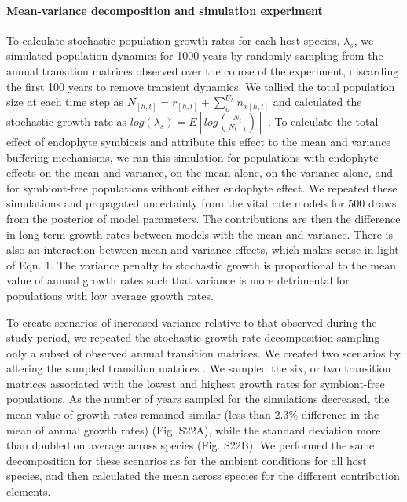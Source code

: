\documentclass[12pt]{article}
\begin{document}
\paragraph*{Mean-variance decomposition and simulation experiment}
To calculate stochastic population growth rates for each host species, $\lambda_s$, we simulated population dynamics for 1000 years by randomly sampling from the annual transition matrices observed over the course of the experiment, discarding the first 100 years to remove transient dynamics. 
We tallied the total population size at each time step as  $N_{[h,t]} = r_{[h,t]} + \sum_{o}^{U_h}n_{x[h,t]}$ and calculated the stochastic growth rate as $log(\lambda_s) = E[log(\frac{N_{t}}{N_{t+1}})]$ \cite{caswell2001matrix,rees2009integral}.
To calculate the total effect of endophyte symbiosis and attribute this effect to the mean and variance buffering mechanisms, we ran this simulation for populations with endophyte effects on the mean and variance, on the mean alone, on the variance alone, and for symbiont-free populations without either endophyte effect. 
We repeated these simulations and propagated uncertainty from the vital rate models for 500 draws from the posterior of model parameters. 
The contributions are then the difference in long-term growth rates between models with the mean and variance. 
There is also an interaction between mean and variance effects, which makes sense in light of Eqn. 1. 
The variance penalty to stochastic growth is proportional to the mean value of annual growth rates such that variance is more detrimental for populations with low average growth rates. 

To create scenarios of increased variance relative to that observed during the study period, we repeated the stochastic growth rate decomposition sampling only a subset of observed annual transition matrices. 
We created two scenarios by altering the sampled transition matrices .
We sampled the six, or two transition matrices associated with the lowest and highest growth rates for symbiont-free populations. 
As the number of years sampled for the simulations decreased, the mean value of growth rates remained similar (less than 2.3\% difference in the mean of annual growth rates) (Fig. S22A), while the standard deviation more than doubled on average across species (Fig. S22B).
We performed the same decomposition for these scenarios as for the ambient conditions for all host species, and then calculated the mean across species for the different contribution elements.   
\end{document}
